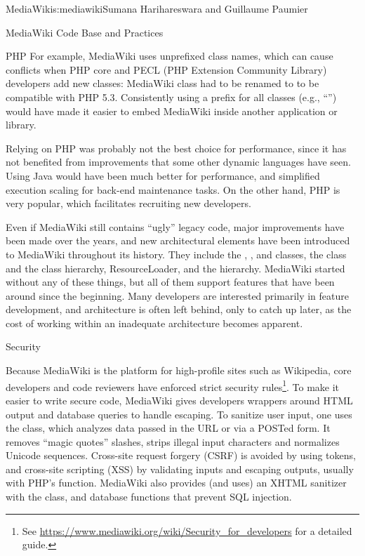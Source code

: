 \begin{aosachapter}{MediaWiki}{s:mediawiki}{Sumana Harihareswara and Guillaume Paumier}
\begin{aosasect1}{MediaWiki Code Base and Practices}
\begin{aosasect2}{PHP}
For example, MediaWiki uses unprefixed class names, which can cause
conflicts when PHP core and PECL (PHP Extension Community Library)
developers add new classes: MediaWiki  class had to be
renamed to  to be compatible with PHP
5.3. Consistently using a prefix for all classes (e.g., ``'')
would have made it easier to embed MediaWiki inside another
application or library.

Relying on PHP was probably not the best choice for performance, since
it has not benefited from improvements that some other dynamic
languages have seen. Using Java would have been much better for
performance, and simplified execution scaling for back-end maintenance
tasks. On the other hand, PHP is very popular, which facilitates
recruiting new developers.

Even if MediaWiki still contains ``ugly'' legacy code, major
improvements have been made over the years, and new architectural
elements have been introduced to MediaWiki throughout its
history. They include the , , and
 classes, the  class and the
 class hierarchy, ResourceLoader, and the 
hierarchy. MediaWiki started without any of these things, but all of
them support features that have been around since the beginning. Many
developers are interested primarily in feature development, and
architecture is often left behind, only to catch up later, as the cost
of working within an inadequate architecture becomes apparent.

\end{aosasect2}

\begin{aosasect2}{Security}

Because MediaWiki is the platform for high-profile sites such as
Wikipedia, core developers and code reviewers have enforced strict
security rules\footnote{See
  \url{https://www.mediawiki.org/wiki/Security\_for\_developers} for a
  detailed guide.}. To make it easier to write secure code, MediaWiki
gives developers wrappers around HTML output and database queries to
handle escaping. To sanitize user input, one uses the
 class, which analyzes data passed in the URL or via
a POSTed form. It removes ``magic quotes'' slashes, strips illegal input
characters and normalizes Unicode sequences. Cross-site request
forgery (CSRF) is avoided by using tokens, and cross-site scripting
(XSS) by validating inputs and escaping outputs, usually with PHP's
 function. MediaWiki also provides (and uses)
an XHTML sanitizer with the  class, and database
functions that prevent SQL injection.


\end{aosasect2}
\end{aosasect1}
\end{aosachapter}
